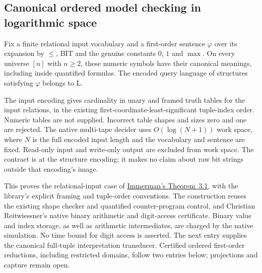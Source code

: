 \begin{result}
\subsection{Canonical ordered model checking in logarithmic space}
Fix a finite relational input vocabulary and a first-order sentence $\varphi$
over its expansion by $\le$, BIT and the genuine constants $0$, $1$ and $\max$.
On every universe $[n]$ with $n\ge2$, these numeric symbols have their canonical
meanings, including inside quantified formulas. The encoded query language of
structures satisfying $\varphi$ belongs to L.

The input encoding gives cardinality in unary and framed truth tables for the
input relations, in the existing first-coordinate-least-significant tuple-index
order. Numeric tables are not supplied. Incorrect table shapes and sizes zero
and one are rejected. The native multi-tape decider uses $O(\log(N+1))$ work
space, where $N$ is the full encoded input length and the vocabulary and sentence
are fixed. Read-only input and write-only output are excluded from work space.
The contract is at the structure encoding; it makes no claim about raw bit
strings outside that encoding's image.

This proves the relational-input case of
\href{https://people.cs.umass.edu/~immerman/book/ch3.pdf\#page=1}{Immerman's
Theorem~3.1}, with the library's explicit framing and tuple-order conventions.
\citep{Immerman1999}
The construction reuses the existing shape checker and quantified counter-program
control, and Christian Reitwiessner's native binary arithmetic and digit-access
certificate. Binary value and index storage, as well as arithmetic intermediates,
are charged by the native simulation. No time bound for digit access is asserted.
The next entry supplies the canonical full-tuple interpretation transducer.
Certified ordered first-order reductions, including restricted domains, follow
two entries below; projections and capture remain open.
\end{result}

